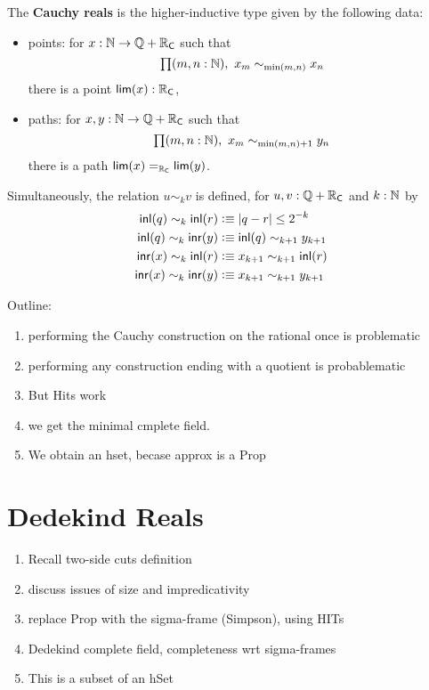 \begin{defn}
  The \textbf{Cauchy reals \RC} is the higher-inductive type given by the following data:
  \begin{itemize}
  \item points: for $x : \N \to \Q + \RC$ such that \[\prd{m, n :
      \N} x_m \sim_{\min(m,n)} x_n\] there is a point $\rclim(x) : \RC$,
  \item paths: for $x, y : \N \to \Q + \RC$
    such that \[\prd{m, n : \N} x_m \sim_{\min(m,n) + 1} y_n\] there
    is a path $\id[\RC]{\rclim(x)}{\rclim(y)}$.
  \end{itemize}
  Simultaneously, the relation $u \sim_k v$ is defined, for $u, v : \Q + \RC$ and $k : \N$ by
  \begin{align*}
    \inl(q) \sim_k \inl(r) &\defeq |q - r| \leq 2^{-k} \\
    \inl(q) \sim_k \inr(y) &\defeq \inl(q) \sim_{k+1} y_{k+1} \\
    \inr(x) \sim_k \inl(r) &\defeq x_{k+1} \sim_{k+1} \inl(r) \\
    \inr(x) \sim_k \inr(y) &\defeq x_{k+1} \sim_{k+1} y_{k+1}
  \end{align*}  
\end{defn}


Outline:
\begin{enumerate}
  \item performing the Cauchy construction on the rational once is problematic
  \item performing any construction ending with a quotient is probablematic
  \item But Hits work
  \item we get the minimal cmplete field.
  \item We obtain an hset, becase approx is a Prop
\end{enumerate}

\section{Dedekind Reals}
\label{sec:dedekind-reals}

\begin{enumerate}
\item Recall two-side cuts definition
\item discuss issues of size and impredicativity
\item replace Prop with the sigma-frame (Simpson), using HITs
\item Dedekind complete field, completeness wrt sigma-frames
\item This is a subset of an hSet
\end{enumerate}

